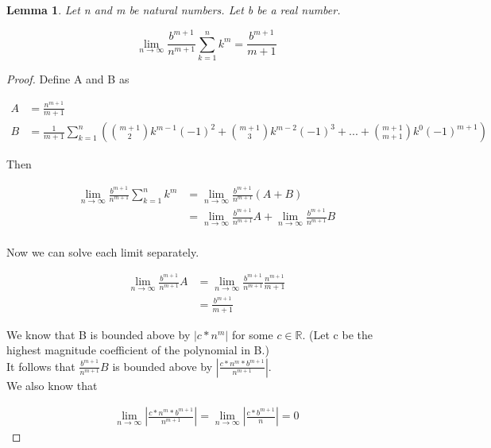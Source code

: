 \documentclass{article}
\newtheorem{lemma}{Lemma}
\begin{document}
\begin{lemma}
Let n and m be natural numbers. Let b be a real number.

\begin{equation*}
\lim_{n \to \infty} \frac{b^{m+1}}{n^{m+1}} \sum_{k=1}^{n} k^{m} = \displaystyle \frac{b^{m+1}}{m+1}
\end{equation*}
\end{lemma}

\begin{proof}

Define A and B as 

\begin{align*}
A &= \displaystyle \frac{n^{m+1}}{m+1} \\
B &= \frac{1}{m+1} \displaystyle \sum_{k=1}^{n} \left( \binom{m+1}{2} k^{m-1} (-1)^2 +  \binom{m+1}{3} k^{m-2} (-1)^3 + ... +  \binom{m+1}{m+1} k^{0} (-1)^{m+1} \right) 
\end{align*}

Then

\begin{align*}
\lim_{n \to \infty} \frac{b^{m+1}}{n^{m+1}} \sum_{k=1}^{n} k^{m} &= \lim_{n \to \infty} \frac{b^{m+1}}{n^{m+1}} (A + B) \\
&= \lim_{n \to \infty} \frac{b^{m+1}}{n^{m+1}} A + \lim_{n \to \infty} \frac{b^{m+1}}{n^{m+1}} B \\
\end{align*}

Now we can solve each limit separately.

\begin{align*}
\lim_{n \to \infty} \frac{b^{m+1}}{n^{m+1}} A &=  \lim_{n \to \infty} \frac{b^{m+1}}{n^{m+1}} \frac{n^{m+1}}{m+1} \\
&=  \frac{b^{m+1}}{m+1} 
\end{align*}

We know that B is bounded above by $|c * n^{m}|$ for some $c \in \mathbb{R}$. (Let c be the highest magnitude coefficient of the polynomial in B.) \\

It follows that $\displaystyle \frac{b^{m+1}}{n^{m+1}} B$ is bounded above by $\displaystyle \left|\frac{c * n^{m} * b^{m+1}}{n^{m+1}}\right|$. \\

We also know that

\begin{align*}
\lim_{n \to \infty} \left|\frac{c * n^{m} * b^{m+1}}{n^{m+1}}\right| = \lim_{n \to \infty} \left|\frac{c * b^{m+1}}{n}\right| = 0
\end{align*} 


\end{proof}
\end{document}
